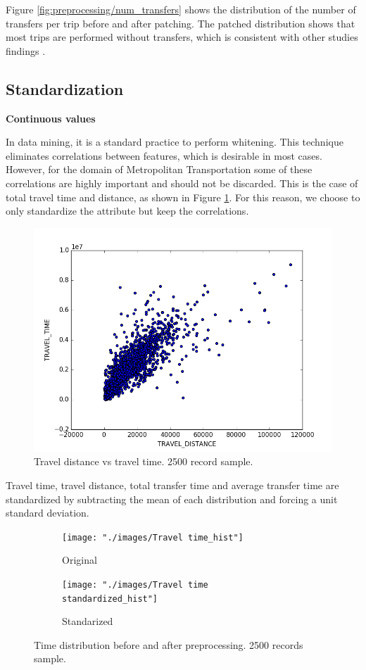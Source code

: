 \documentclass{article}
\begin{document}
Figure \ref{fig:preprocessing/num_transfers} shows the distribution of the number of transfers per trip before and after patching. The patched distribution shows that most trips are performed without transfers, which is consistent with other studies findings \cite{bhaskar2015passenger}.

\subsection{Standardization} 

\textbf{Continuous values}

In data mining, it is a standard practice to perform whitening. This technique eliminates correlations between features, which is desirable in most cases. However, for the domain of Metropolitan Transportation some of these correlations are highly important and should not be discarded. This is the case of total travel time and distance, as shown in Figure \ref{fig:preprocessing/distance_time_correlation}. For this reason, we choose to only standardize the attribute but keep the correlations. 

\begin{figure}[H]
  \centering
  \includegraphics[width=.6\linewidth]{./images/distance_vs_time.png}
  \caption{Travel distance vs travel time. 2500 record sample.}
  \label{fig:preprocessing/distance_time_correlation}
\end{figure}

Travel time, travel distance, total transfer time and average transfer time are standardized by subtracting the mean of each distribution and forcing a unit standard deviation.

\begin{figure}[H]
  \centering
  \begin{subfigure}[b]{.45\textwidth}
  	\centering
  	\texttt{[image: "./images/Travel time\_hist"]}
  	\caption{Original}
  \end{subfigure}
  \begin{subfigure}[b]{.45\textwidth}
  	\centering
  	\texttt{[image: "./images/Travel time standardized\_hist"]}
  	\caption{Standarized}
  \end{subfigure}
  \caption{Time distribution before and after preprocessing. 2500 records sample.}
  	\label{fig:preprocessing/time}
\end{figure}
\end{document}
